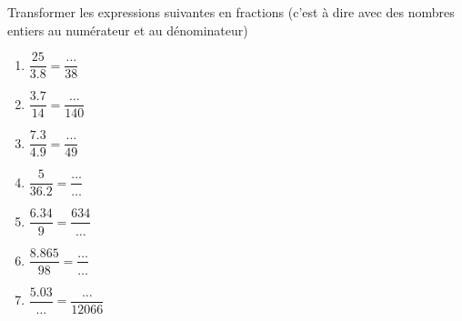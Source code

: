 
\begin{exercice}\label{exosmath-0867}

    Transformer les expressions suivantes en fractions (c'est à dire avec des nombres entiers au numérateur et au dénominateur)
    \begin{multicols}{2}
    \begin{enumerate}
        \item
            \( \dfrac{ 25 }{ 3.8 }=\dfrac{ \ldots }{ 38 }\)
        \item
            \( \dfrac{  3.7  }{  14  }=\dfrac{  \ldots  }{ 140 }\)
        \item
            \( \dfrac{  7.3  }{  4.9  }=\dfrac{  \ldots  }{ 49 }\)
        \item
            \( \dfrac{  5  }{  36.2  }=\dfrac{ \ldots   }{ \ldots }\)
        \item
            \( \dfrac{  6.34  }{  9  }=\dfrac{  634  }{ \ldots }\)
        \item
            \( \dfrac{  8.865  }{  98  }=\dfrac{  \ldots  }{ \ldots }\)
        \item
            \( \dfrac{  5.03  }{  \ldots  }=\dfrac{  \ldots  }{ 12066 }\)
    \end{enumerate}
    \end{multicols}

\end{exercice}
